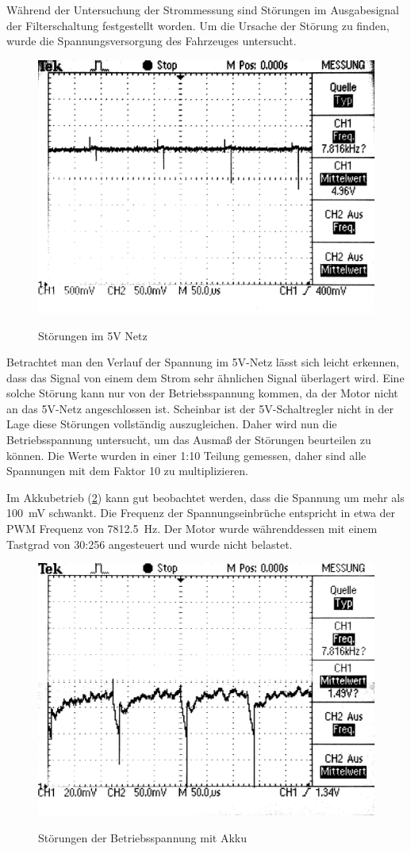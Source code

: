 Während der Untersuchung der Strommessung sind Störungen im Ausgabesignal der Filterschaltung festgestellt worden. Um die Ursache der Störung zu finden, wurde die Spannungsversorgung
des Fahrzeuges untersucht.

\begin{figure}[H]
\centering
\includegraphics[width=.8\textwidth]{5V_supply.png}\\
\caption{Störungen im 5V Netz}%
\label{fig:5V Supply}
\end{figure}

Betrachtet man den Verlauf der Spannung im 5V-Netz lässt sich leicht erkennen, dass das Signal von einem dem Strom sehr ähnlichen Signal überlagert wird.
Eine solche Störung kann nur von der Betriebsspannung kommen, da der Motor nicht an das 5V-Netz angeschlossen ist. Scheinbar ist der 5V-Schaltregler nicht in der
Lage diese Störungen vollständig auszugleichen.
Daher wird nun die Betriebsspannung untersucht, um das Ausmaß der Störungen beurteilen zu können.
Die Werte wurden in einer 1:10 Teilung gemessen, daher sind alle Spannungen mit dem Faktor 10 zu multiplizieren.

Im Akkubetrieb (\cref{fig:accu_supply}) kann gut beobachtet werden, dass die Spannung um mehr als \SI{100}{\mV} schwankt. Die Frequenz der Spannungseinbrüche entspricht in etwa
der PWM Frequenz von \SI{7812,5}{\hertz}.  Der Motor wurde währenddessen mit einem Tastgrad von 30:256 angesteuert und wurde nicht belastet.


\begin{figure}[H]
\centering
\includegraphics[width=.8\textwidth]{VCC_AKKU.png}\\
\caption{Störungen der Betriebsspannung mit Akku}%
\label{fig:accu_supply}
\end{figure}


